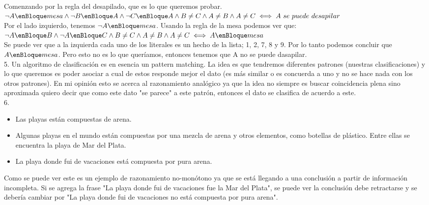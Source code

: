 Comenzando por la regla del desapilado, que es lo que queremos probar. \\ 

$\neg A \enBloque mesa \wedge \neg B \enBloque A \wedge \neg C \enBloque A \wedge B \neq C \wedge A \neq B \wedge A \neq C \iff A\ se\ puede\ desapilar$ \\

Por el lado izquierdo, tenemos $\neg A \enBloque mesa$. Usando la regla de la mesa podemos ver que: \\

$\neg A \enBloque B \wedge \neg A \enBloque C \wedge B \neq C \wedge A \neq B \wedge A \neq C \iff A \enBloque mesa$ \\

Se puede ver que a la izquierda cada uno de los literales es un hecho de la lista; 1, 2, 7, 8 y 9. Por lo tanto podemos concluir que $A \enBloque mesa$. Pero esto no es lo que queríamos, entonces tenemos que A no se puede dasapilar.\\


5. Un algoritmo de clasificación es en esencia un pattern matching. La idea es que tendremos diferentes patrones (nuestras clasificaciones) y lo que queremos es poder asociar a cual de estos responde mejor el dato (es más similar o es concuerda a uno y no se hace nada con los otros patrones). En mi opinión esto se acerca al razonamiento analógico ya que la idea no siempre es buscar coincidencia plena sino aproximada quiero decir que como este dato "se parece" a este patrón, entonces el dato se clasifica de acuerdo a este. \\

6. 
\begin{itemize}
	\item Las playas están compuestas de arena.
	\item Algunas playas en el mundo están compuestas por una mezcla de arena y otros elementos, como botellas de plástico. Entre ellas se encuentra la playa de Mar del Plata.
	\item La playa donde fui de vacaciones está compuesta por pura arena.
\end{itemize}

Como se puede ver este es un ejemplo de razonamiento no-monótono ya que se está llegando a una conclusión a partir de información incompleta. Si se agrega la frase "La playa donde fui de vacaciones fue la Mar del Plata", se puede ver la conclusión debe retractarse y se debería cambiar por "La playa donde fui de vacaciones no está compuesta por pura arena". \\

